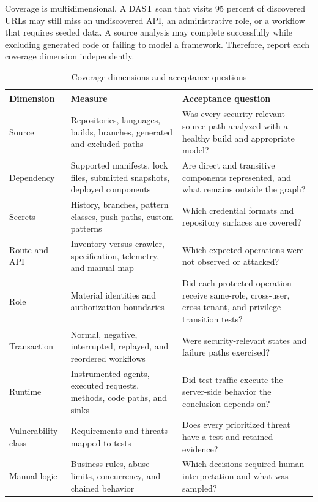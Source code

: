 \documentclass[11pt,letterpaper]{article}
\begin{document}
Coverage is multidimensional. A DAST scan that visits 95 percent of discovered URLs may still miss an undiscovered API, an administrative role, or a workflow that requires seeded data. A source analysis may complete successfully while excluding generated code or failing to model a framework. Therefore, report each coverage dimension independently.

\begin{table}[H]
\centering
\caption{Coverage dimensions and acceptance questions}
\small
\begin{tabularx}{\textwidth}{@{}L{1.45in}Y Y@{}}
\toprule
\textbf{Dimension} & \textbf{Measure} & \textbf{Acceptance question} \\
\midrule
Source & Repositories, languages, builds, branches, generated and excluded paths & Was every security-relevant source path analyzed with a healthy build and appropriate model? \\
Dependency & Supported manifests, lock files, submitted snapshots, deployed components & Are direct and transitive components represented, and what remains outside the graph? \\
Secrets & History, branches, pattern classes, push paths, custom patterns & Which credential formats and repository surfaces are covered? \\
Route and API & Inventory versus crawler, specification, telemetry, and manual map & Which expected operations were not observed or attacked? \\
Role & Material identities and authorization boundaries & Did each protected operation receive same-role, cross-user, cross-tenant, and privilege-transition tests? \\
Transaction & Normal, negative, interrupted, replayed, and reordered workflows & Were security-relevant states and failure paths exercised? \\
Runtime & Instrumented agents, executed requests, methods, code paths, and sinks & Did test traffic execute the server-side behavior the conclusion depends on? \\
Vulnerability class & Requirements and threats mapped to tests & Does every prioritized threat have a test and retained evidence? \\
Manual logic & Business rules, abuse limits, concurrency, and chained behavior & Which decisions required human interpretation and what was sampled? \\
\bottomrule
\end{tabularx}
\end{table}
\end{document}
